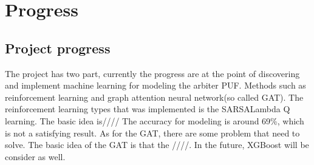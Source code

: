 \chapter{Progress}

\section{Project progress}
The project has two part, currently the progress are at the point of discovering and implement machine learning for modeling the arbiter PUF. Methods such as reinforcement learning
and graph attention neural network(so called GAT). The reinforcement learning types that was implemented is the SARSALambda Q learning. The basic idea is//// The accuracy for modeling is around
69\%, which is not a satisfying result. As for the GAT, there are some problem that need to solve. The basic idea of the GAT is that the ////. In the future, XGBoost will be 
consider as well.



